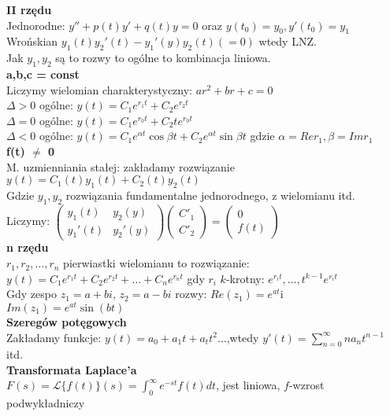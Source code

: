 \documentclass{article}
\begin{document}
\textbf{II rzędu}\\
Jednorodne: $y''+ p(t)y' + q(t)y = 0$ oraz $y(t_0) = y_0, y'(t_0)=y_1$\\
Wrońskian $y_1(t)y_2'(t)-y_1'(y)y_2(t)(= 0)$ wtedy LNZ.\\Jak $y_1,y_2$ są to rozwy to ogólne to kombinacja liniowa.\\
\textbf{a,b,c = const}\\
Liczymy wielomian charakterystyczny: $ar^2 + br + c = 0$\\
$\Delta > 0$ ogólne: $y(t) = C_1e^{r_1t} + C_2e^{r_2t}$\\
$\Delta = 0$ ogólne: $y(t) = C_1e^{r_0t} + C_2te^{r_0t}$\\
$\Delta < 0$ ogólne: $y(t) = C_1e^{\alpha t}\cos{\beta t} + C_2e^{\alpha t}\sin{\beta t}$ gdzie $\alpha = Re r_1, \beta = Im r_1$\\
\textbf{f(t) $\neq$ 0}\\
M. uzmienniania stałej: zakładamy rozwiązanie $y(t)=C_1(t)y_1(t)+C_2(t)y_2(t)$\\
Gdzie $y_1, y_2$ rozwiązania fundamentalne jednorodnego, z wielomianu itd.\\
Liczymy: $\begin{pmatrix} y_1(t) & y_2(y)\\ y_1'(t) & y_2'(y) \end{pmatrix} \begin{pmatrix} C'_1 \\ C'_2\end{pmatrix} = \begin{pmatrix} 0 \\ f(t)\end{pmatrix}$\\
\textbf{n rzędu}\\
$r_1,r_2,\ldots,r_n$ pierwiastki wielomianu to rozwiązanie:\\
$y(t) = C_1e^{r_1t}+C_2e^{r_2t}+\ldots+C_ne^{r_nt}$ gdy $r_i$ $k$-krotny: $e^{r_it},\ldots,t^{k-1}e^{r_it}$\\
Gdy zespo $z_1 = a +bi$, $z_2 = a-bi$ rozwy: $Re(z_1)=e^{at}$i $Im(z_1)=e^{at}\sin(bt)$\\
\textbf{Szeregów potęgowych}\\
Zakładamy funkcje: $y(t) = a_0 + a_1t + a_tt^2 \ldots$,wtedy $y'(t) = \sum_{n=0}^\infty na_nt^{n-1}$ itd.\\
\textbf{Transformata Laplace'a}\\
$F(s) = \mathcal{L}\{f(t)\}(s) = \int_0^\infty e^{-st}f(t)dt$, jest liniowa, $f$-wzrost podwykładniczy
\end{document}
